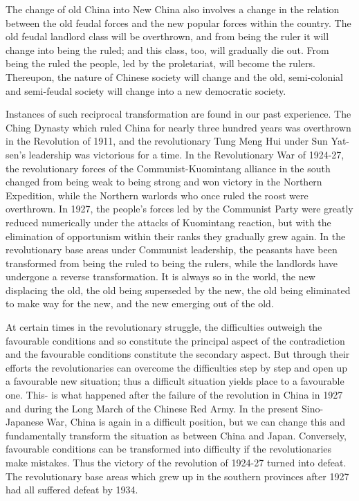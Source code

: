 \documentclass{article}
\begin{document}
The change of old China into New China also involves a change in the relation
between the old feudal forces and the new popular forces within the country.
The old feudal landlord class will be overthrown, and from being the ruler it
will change into being the ruled; and this class, too, will gradually die out.
From being the ruled the people, led by the proletariat, will become the
rulers. Thereupon, the nature of Chinese society will change and the old,
semi-colonial and semi-feudal society will change into a new democratic
society.

Instances of such reciprocal transformation are found in our past experience.
The Ching Dynasty which ruled China for nearly three hundred years was
overthrown in the Revolution of 1911, and the revolutionary Tung Meng Hui under
Sun Yat-sen's leadership was victorious for a time. In the Revolutionary War of
1924-27, the revolutionary forces of the Communist-Kuomintang alliance in the
south changed from being weak to being strong and won victory in the Northern
Expedition, while the Northern warlords who once ruled the roost were
overthrown. In 1927, the people's forces led by the Communist Party were
greatly reduced numerically under the attacks of Kuomintang reaction, but with
the elimination of opportunism within their ranks they gradually grew again. In
the revolutionary base areas under Communist leadership, the peasants have been
transformed from being the ruled to being the rulers, while the landlords have
undergone a reverse transformation. It is always so in the world, the new
displacing the old, the old being superseded by the new, the old being
eliminated to make way for the new, and the new emerging out of the old.

At certain times in the revolutionary struggle, the difficulties outweigh the
favourable conditions and so constitute the principal aspect of the
contradiction and the favourable conditions constitute the secondary aspect.
But through their efforts the revolutionaries can overcome the difficulties
step by step and open up a favourable new situation; thus a difficult situation
yields place to a favourable one. This- is what happened after the failure of
the revolution in China in 1927 and during the Long March of the Chinese Red
Army. In the present Sino-Japanese War, China is again in a difficult position,
but we can change this and fundamentally transform the situation as between
China and Japan. Conversely, favourable conditions can be transformed into
difficulty if the revolutionaries make mistakes. Thus the victory of the
revolution of 1924-27 turned into defeat. The revolutionary base areas which
grew up in the southern provinces after 1927 had all suffered defeat by 1934.
\end{document}
